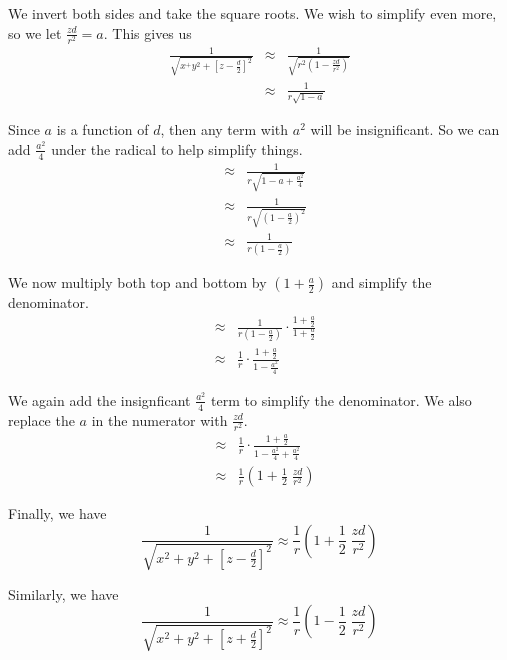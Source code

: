 We invert both sides and take the square roots.
We wish to simplify even more, so we let $\frac{zd}{r^2}=a$.
This gives us
\begin{eqnarray*}
  \frac{1}{\sqrt{x^ + y^2 + [z-\frac{d}{2}]^2}}
  &\approx& \frac{1}{\sqrt{r^2 \left( 1 - \frac{zd}{r^2} \right)}} \\
  &\approx& \frac{1}{r \sqrt{1 - a}}
\end{eqnarray*}

Since $a$ is a function of $d$, then any term with $a^2$ will be insignificant.
So we can add $\frac{a^2}{4}$ under the radical to help simplify things.
\begin{eqnarray*}
  &\approx& \frac{1}{r \sqrt{1 - a + \frac{a^2}{4}}} \\
  &\approx& \frac{1}{r \sqrt{\left(1 - \frac{a}{2} \right)^2}} \\
  &\approx& \frac{1}{r \left( 1 - \frac{a}{2} \right)}
\end{eqnarray*}

We now multiply both top and bottom by $(1+\frac{a}{2})$ and simplify the denominator.
\begin{eqnarray*}
  &\approx& \frac{1}{r\left(1-\frac{a}{2}\right)} \cdot \frac{1+\frac{a}{2}}{1+\frac{a}{2}} \\
  &\approx& \frac{1}{r} \cdot \frac{1+\frac{a}{2}}{1-\frac{a^2}{4}}
\end{eqnarray*}

We again add the insignficant $\frac{a^2}{4}$ term to simplify the denominator.
We also replace the $a$ in the numerator with $\frac{zd}{r^2}$.
\begin{eqnarray*}
  &\approx& \frac{1}{r} \cdot \frac{1+\frac{a}{2}}{1-\frac{a^2}{4}+\frac{a^2}{4}} \\
  &\approx& \frac{1}{r} \left( 1 + \frac{1}{2} \; \frac{zd}{r^2} \right) 
\end{eqnarray*}

Finally, we have
\begin{equation*}
  \frac{1}{\sqrt{x^2 + y^2 + [z - \frac{d}{2}]^2}} 
  \approx \frac{1}{r} \left( 1 + \frac{1}{2} \; \frac{zd}{r^2} \right)
\end{equation*}

Similarly, we have
\begin{equation*}
  \frac{1}{\sqrt{x^2 + y^2 + [z + \frac{d}{2}]^2}}
  \approx \frac{1}{r} \left( 1 - \frac{1}{2} \; \frac{zd}{r^2} \right)
\end{equation*}

